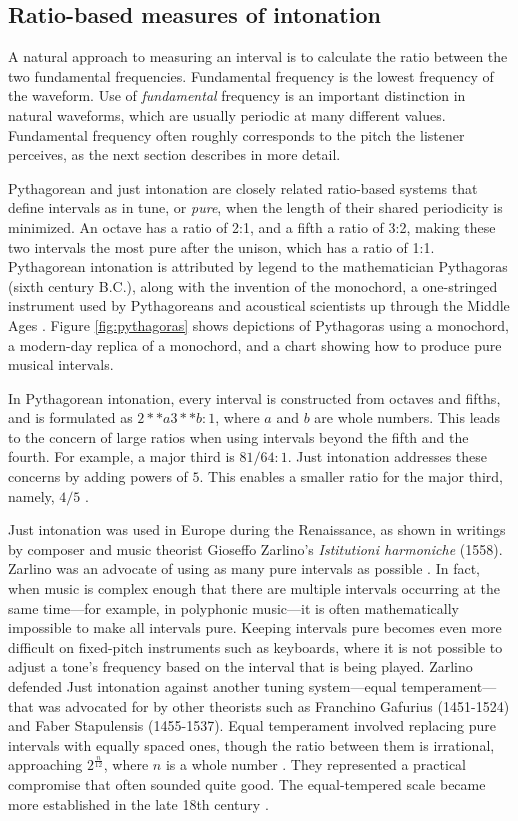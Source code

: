\subsection{Ratio-based measures of intonation}
\label{sec:ratio}
A natural approach to measuring an interval is to calculate the ratio between the two fundamental frequencies. Fundamental frequency is the lowest frequency of the waveform. Use of \textit{fundamental} frequency is an important distinction in natural waveforms, which are usually periodic at many different values. Fundamental frequency often roughly corresponds to the pitch the listener perceives, as the next section describes in more detail.

Pythagorean and just intonation are closely related ratio-based systems that define intervals as in tune, or \textit{pure}, when the length of their shared periodicity is minimized. An octave has a ratio of 2:1, and a fifth a ratio of 3:2, making these two intervals the most pure after the unison, which has a ratio of 1:1. Pythagorean intonation is attributed by legend to the mathematician Pythagoras (sixth century B.C.), along with the invention of the monochord, a one-stringed instrument used by Pythagoreans and acoustical scientists up through the Middle Ages \cite[][Ch.~2, p.~2 and Ch.~4, p.~42]{weiss2007music}. Figure \ref{fig:pythagoras} shows depictions of Pythagoras using a monochord, a modern-day replica of a monochord, and a chart showing how to produce pure musical intervals. 

In Pythagorean intonation, every interval is constructed from octaves and fifths, and is formulated as $2**a3**b:1$, where $a$ and $b$ are whole numbers. This leads to the concern of large ratios when using intervals beyond the fifth and the fourth. For example, a major third is $81/64:1$. Just intonation addresses these concerns by adding powers of $5$. This enables a smaller ratio for the major third, namely, $4/5$ \cite{parncutt2018psychocultural}.

Just intonation was used in Europe during the Renaissance, as shown in writings by composer and music theorist Gioseffo Zarlino's \textit{Istitutioni harmoniche} (1558). Zarlino was an advocate of using as many pure intervals as possible \cite{goldman1991new}. In fact, when music is complex enough that there are multiple intervals occurring at the same time---for example, in polyphonic music---it is often mathematically impossible to make all intervals pure. Keeping intervals pure becomes even more difficult on fixed-pitch instruments such as keyboards, where it is not possible to adjust a tone's frequency based on the interval that is being played. Zarlino defended Just intonation against another tuning system---equal temperament---that was advocated for by other theorists such as Franchino Gafurius (1451-1524) and Faber Stapulensis (1455-1537). Equal temperament involved replacing pure intervals with equally spaced ones, though the ratio between them is irrational, approaching $2^\frac{n}{12}$, where $n$ is a whole number \cite{goldman1991new}. They represented a practical compromise that often sounded quite good. The equal-tempered scale became more established in the late 18th century \cite{equaltemperament}.

